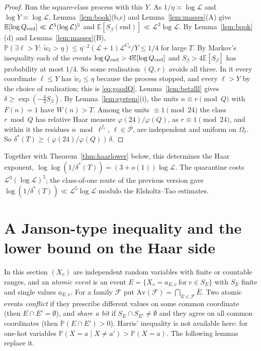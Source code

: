 \documentclass[11pt,reqno]{amsart}
\theoremstyle{definition}
\newcommand{\cP}{\mathcal P}
\newcommand{\Lc}{\mathcal L}
\newcommand{\E}{\mathbb E}
\newcommand{\PP}{\mathbb P}
\begin{document}
\begin{proof}
Run the square-class process with this $Y$.  As $1/\eta\asymp\log\Lc$ and
$\log Y\asymp\log\Lc$, Lemma~\ref{lem:book}(b,c) and Lemma~\ref{lem:masses}(A)
give $\E[\log Q_{\rm end}]\ll\Lc^3(\log\Lc)^5$ and
$\E[S_\beta(\mathrm{end})]\ll\Lc^3\log\Lc$.  By Lemma~\ref{lem:book}(d) and
Lemma~\ref{lem:masses}(B),
$\PP(\exists\ell>Y:\ \tilde w_\ell>\eta)\le\eta^{-2}(\Lc+1)\Lc^{C_0}/Y\le1/4$ for
large $T$.  By Markov's inequality each of the events
$\log Q_{\rm end}>4\E[\log Q_{\rm end}]$ and $S_\beta>4\E[S_\beta]$ has probability at
most $1/4$.  So some realisation $(Q,r)$ avoids all three.  In it every
coordinate $\ell\le Y$ has $\tilde w_\ell\le\eta$ because the process stopped, and
every $\ell>Y$ by the choice of realisation; this is \eqref{eq:goodQ}.
Lemma~\ref{lem:betalll} gives $\delta\ge\exp(-\frac43S_\beta)$.  By
Lemma~\ref{lem:system}(i), the units $n\equiv r\pmod Q$ with $F(n)=1$ have
$W(n)>T$.  Among the units $\equiv1\pmod{24}$ the class $r\bmod Q$ has relative
Haar measure $\varphi(24)/\varphi(Q)$, as $r\equiv1\pmod{24}$, and within it the
residues $n\bmod\ell^{f_\ell}$, $\ell\in\cP$, are independent and uniform on
$\Omega_\ell$.  So $\delta^*(T)\ge(\varphi(24)/\varphi(Q))\,\delta$.
\end{proof}

Together with Theorem~\ref{thm:haarlower} below, this determines the
Haar exponent, $\log\log(1/\delta^*(T))=(3+o(1))\log\Lc$.  The quarantine costs
$\Lc^3(\log\Lc)^5$; the class-of-one route of the previous version gave
$\log(1/\delta^*(T))\ll\Lc^5\log\Lc$ modulo the Elsholtz--Tao estimates.

\section{A Janson-type inequality and the lower bound on the Haar side}\label{sec:haarlower}

In this section $(X_v)$ are independent random variables with finite or
countable ranges, and an \emph{atomic event} is an event
$E=\{X_v=a_{E,v}\ \text{for}\ v\in S_E\}$ with $S_E$ finite and single
values $a_{E,v}$.  For a family $\mathcal F$ put
$\mathrm{Av}(\mathcal F)=\bigcap_{E\in\mathcal F}\bar E$.  Two atomic events
\emph{conflict} if they prescribe different values on some common
coordinate (then $E\cap E'=\emptyset$), and \emph{share a bit} if
$S_E\cap S_{E'}\ne\emptyset$ and they agree on all common coordinates (then
$\PP(E\cap E')>0$).  Harris' inequality is not available here: for one-hot
variables $\PP(X=a\mid X\ne a')>\PP(X=a)$.  The following lemmas replace it.
\end{document}

